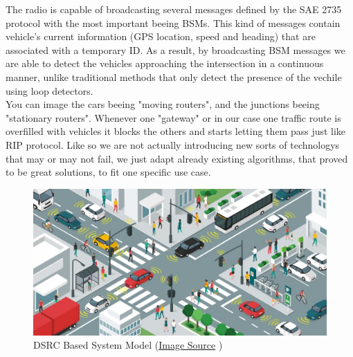 \documentclass[17pt]{report}
\begin{document}
\indent \indent 
The radio is capable of broadcasting several messages defined by the SAE 2735
\cite{Kenney2011IOT} protocol with the most important beeing BSMs. This kind of 
messages contain vehicle's current information (GPS location, speed and heading) that are associated with a temporary ID. As a result, by broadcasting
BSM messages we are able to detect the vehicles approaching the intersection in a
continuous manner, unlike traditional methods that only detect the presence of the
vechile using loop detectors.\\
\indent \indent 
You can image the cars beeing "moving routers", and the junctions beeing
"stationary routers". Whenever one "gateway" or in our case one traffic route is
overfilled with vehicles it blocks the others and starts letting them pass just like
RIP protocol. Like so we are not actually introducing new sorts of technologys that may
or may not fail, we just adapt already existing algorithms, that proved to be great
solutions, to fit one specific use case.

\begin{figure}[h!]
    \includegraphics[width=\textwidth]{DSRCSystemModel.jpg}
    \caption{DSRC Based System Model 
    (\href{https://www.frost.com/frost-perspectives/what-is-required-for-a-scalable-and-industry-wide-vehicle-to-everything-v2x-deployment/}{Image Source} \textcopyright)}
    \label{fig:DSRCSystemModel}
\end{figure}
\end{document}
